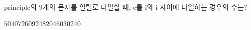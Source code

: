 principle의 $9$개의 문자를 일렬로 나열할 때, e를 i와 i 사이에 나열하는 경우의 수는?
\begin{choices32}{$5040$}{$7260$}{$9248$}{$20460$}{$30240$}\end{choices32}

